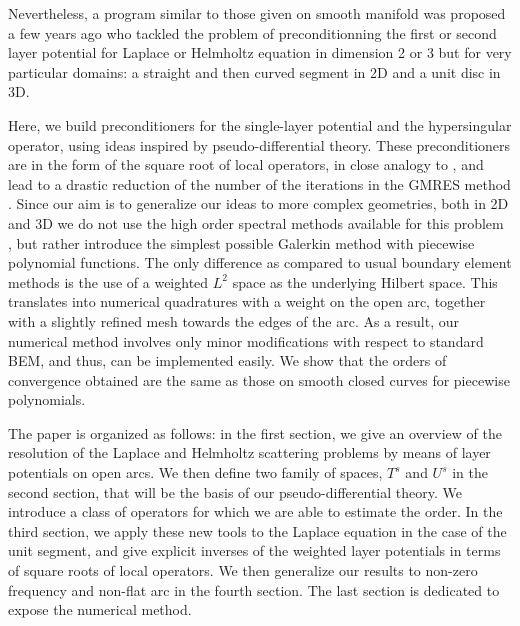 \documentclass[a4paper]{article}
\begin{document}
Nevertheless, a program similar to those given on smooth manifold was proposed a few years ago \cite{bruno2012second,jerez2012explicit,hiptmair2017closed}  who tackled the problem of preconditionning the first or second layer potential for Laplace or Helmholtz equation in dimension 2 or 3 but for very particular domains: a straight and then curved segment in 2D and a unit disc in 3D. 

Here, we build preconditioners for the single-layer potential and the hypersingular operator, using ideas inspired by pseudo-differential theory. These preconditioners are in the form of the square root of local operators, in close analogy to \cite{antoine2007generalized}, and lead to a drastic reduction of the number of the iterations in the GMRES method \cite{saad1986gmres}. Since our aim is to generalize our ideas to more complex geometries, both in 2D and 3D we do not use the high order spectral methods available for this problem \cite{bruno2012second}, but rather introduce the simplest possible Galerkin method with piecewise polynomial functions. The only difference as compared to usual boundary element methods is the use of a weighted $L^2$ space as the underlying Hilbert space. This translates into numerical quadratures with a weight on the open arc, together with a slightly refined mesh towards the edges of the arc. As a result, our numerical method involves only minor modifications with respect to standard BEM, and thus, can be implemented easily. We show that the orders of convergence obtained are the same as those on smooth closed curves for piecewise polynomials. 
	
The paper is organized as follows: in the first section, we give an overview of the resolution of the Laplace and Helmholtz scattering problems by means of layer potentials on open arcs. We then define two family of spaces, $T^s$ and $U^s$ in the second section, that will be the basis of our pseudo-differential theory. We introduce a class of operators for which we are able to estimate the order. In the third section, we apply these new tools to the Laplace equation in the case of the unit segment, and give explicit inverses of the weighted layer potentials in terms of square roots of local operators. We then generalize our results to non-zero frequency and non-flat arc in the fourth section. The last section is dedicated to expose the numerical method. 
\end{document}
